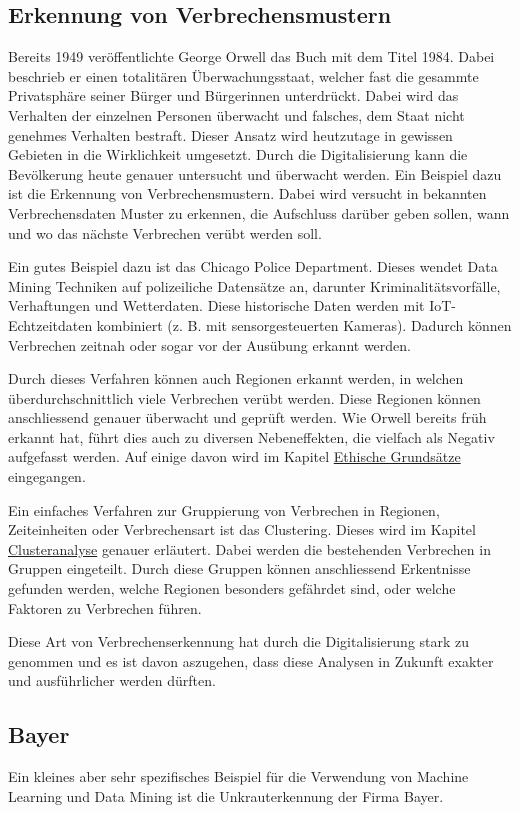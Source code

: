 \subsection{Erkennung von Verbrechensmustern}
Bereits 1949 veröffentlichte George Orwell das Buch mit dem Titel 1984. Dabei beschrieb er einen totalitären Überwachungsstaat, welcher fast die gesammte Privatsphäre seiner Bürger und Bürgerinnen unterdrückt. Dabei wird das Verhalten der einzelnen Personen überwacht und falsches, dem Staat nicht genehmes Verhalten bestraft. 
Dieser Ansatz wird heutzutage in gewissen Gebieten in die Wirklichkeit umgesetzt. Durch die Digitalisierung kann die Bevölkerung heute genauer untersucht und überwacht werden.
Ein Beispiel dazu ist die Erkennung von Verbrechensmustern. Dabei wird versucht in bekannten Verbrechensdaten Muster zu erkennen, die Aufschluss darüber geben sollen, wann und wo das nächste Verbrechen verübt werden soll.

Ein gutes Beispiel dazu ist das Chicago Police Department. Dieses wendet Data Mining Techniken auf polizeiliche Datensätze an, darunter Kriminalitätsvorfälle, Verhaftungen und Wetterdaten. Diese historische Daten werden mit IoT-Echtzeitdaten kombiniert (z. B. mit sensorgesteuerten Kameras). Dadurch können Verbrechen zeitnah oder sogar vor der Ausübung erkannt werden.

Durch dieses Verfahren können auch Regionen erkannt werden, in welchen überdurchschnittlich viele Verbrechen verübt werden. Diese Regionen können anschliessend genauer überwacht und geprüft werden.
Wie Orwell bereits früh erkannt hat, führt dies auch zu diversen Nebeneffekten, die vielfach als Negativ aufgefasst werden. Auf einige davon wird im Kapitel \hyperref[sec:ethics]{Ethische Grundsätze} eingegangen.\cite{crime-prevention}

Ein einfaches Verfahren zur Gruppierung von Verbrechen in Regionen, Zeiteinheiten oder Verbrechensart ist das Clustering. Dieses wird im Kapitel \hyperref[sec:clustering]{Clusteranalyse} genauer erläutert. Dabei werden die bestehenden Verbrechen in Gruppen eingeteilt. Durch diese Gruppen können anschliessend Erkentnisse gefunden werden, welche Regionen besonders gefährdet sind, oder welche Faktoren zu Verbrechen führen.\cite{crime}

Diese Art von Verbrechenserkennung hat durch die Digitalisierung stark zu genommen und es ist davon aszugehen, dass diese Analysen in Zukunft exakter und ausführlicher werden dürften.

\subsection{Bayer}
Ein kleines aber sehr spezifisches Beispiel für die Verwendung von Machine Learning und Data Mining ist die Unkrauterkennung der Firma Bayer.

